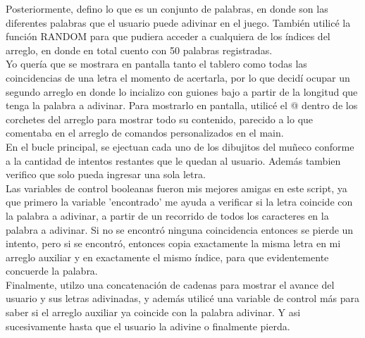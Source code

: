 \documentclass[letter,11pt]{article}
\begin{document}
Posteriormente, defino lo que es un conjunto de palabras, en donde son las diferentes palabras que el usuario puede adivinar en el juego. También utilicé la función RANDOM para que pudiera acceder a cualquiera de los índices del arreglo, en donde en total cuento con 50 palabras registradas.\\

Yo quería que se mostrara en pantalla tanto el tablero como todas las coincidencias de una letra el momento de acertarla, por lo que decidí ocupar un segundo arreglo en donde lo incializo con guiones bajo a partir de la longitud que tenga la palabra a adivinar. Para mostrarlo en pantalla, utilicé el @ dentro de los corchetes del arreglo para mostrar todo su contenido, parecido a lo que comentaba en el arreglo de comandos personalizados en el main.\\

En el bucle principal, se ejectuan cada uno de los dibujitos del muñeco conforme a la cantidad de intentos restantes que le quedan al usuario. Además tambien verifico que solo pueda ingresar una sola letra.\\
Las variables de control booleanas fueron mis mejores amigas en este script, ya que primero la variable 'encontrado' me ayuda a verificar si la letra coincide con la palabra a adivinar, a partir de un recorrido de todos los caracteres en la palabra a adivinar. Si no se encontró ninguna coincidencia entonces se pierde un intento, pero si se encontró, entonces copia exactamente la misma letra en mi arreglo auxiliar y en exactamente el mismo índice, para que evidentemente concuerde la palabra.\\
Finalmente, utilzo una concatenación de cadenas para mostrar el avance del usuario y sus letras adivinadas, y además utilicé una variable de control más para saber si el arreglo auxiliar ya coincide con la palabra adivinar. Y asi sucesivamente hasta que el usuario la adivine o finalmente pierda.
\end{document}
